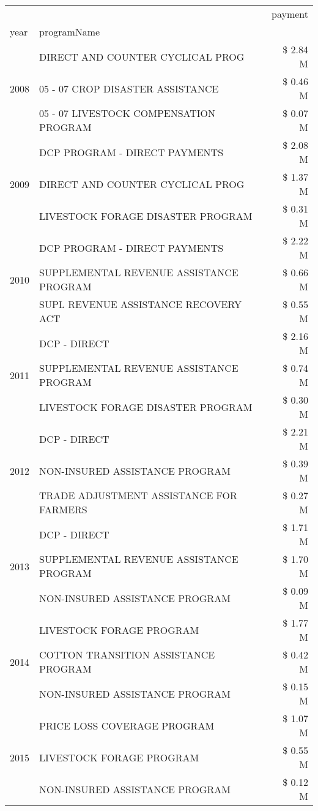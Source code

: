 \begin{tabular}{llr}
\toprule
 &  & payment \\
year & programName &  \\
\midrule
\multirow[t]{3}{*}{2008} & DIRECT AND COUNTER CYCLICAL PROG & \$ 2.84 M \\
 & 05 - 07 CROP DISASTER ASSISTANCE & \$ 0.46 M \\
 & 05 - 07 LIVESTOCK COMPENSATION PROGRAM & \$ 0.07 M \\
\cline{1-3}
\multirow[t]{3}{*}{2009} & DCP PROGRAM - DIRECT PAYMENTS & \$ 2.08 M \\
 & DIRECT AND COUNTER CYCLICAL PROG & \$ 1.37 M \\
 & LIVESTOCK FORAGE DISASTER  PROGRAM & \$ 0.31 M \\
\cline{1-3}
\multirow[t]{3}{*}{2010} & DCP PROGRAM - DIRECT PAYMENTS & \$ 2.22 M \\
 & SUPPLEMENTAL REVENUE ASSISTANCE PROGRAM & \$ 0.66 M \\
 & SUPL REVENUE ASSISTANCE RECOVERY ACT & \$ 0.55 M \\
\cline{1-3}
\multirow[t]{3}{*}{2011} & DCP - DIRECT & \$ 2.16 M \\
 & SUPPLEMENTAL REVENUE ASSISTANCE PROGRAM & \$ 0.74 M \\
 & LIVESTOCK FORAGE DISASTER PROGRAM & \$ 0.30 M \\
\cline{1-3}
\multirow[t]{3}{*}{2012} & DCP - DIRECT & \$ 2.21 M \\
 & NON-INSURED ASSISTANCE PROGRAM & \$ 0.39 M \\
 & TRADE ADJUSTMENT ASSISTANCE FOR FARMERS & \$ 0.27 M \\
\cline{1-3}
\multirow[t]{3}{*}{2013} & DCP - DIRECT & \$ 1.71 M \\
 & SUPPLEMENTAL REVENUE ASSISTANCE PROGRAM & \$ 1.70 M \\
 & NON-INSURED ASSISTANCE PROGRAM & \$ 0.09 M \\
\cline{1-3}
\multirow[t]{3}{*}{2014} & LIVESTOCK FORAGE PROGRAM & \$ 1.77 M \\
 & COTTON TRANSITION ASSISTANCE PROGRAM & \$ 0.42 M \\
 & NON-INSURED ASSISTANCE PROGRAM & \$ 0.15 M \\
\cline{1-3}
\multirow[t]{3}{*}{2015} & PRICE LOSS COVERAGE PROGRAM & \$ 1.07 M \\
 & LIVESTOCK FORAGE PROGRAM & \$ 0.55 M \\
 & NON-INSURED ASSISTANCE PROGRAM & \$ 0.12 M \\

\end{tabular}
